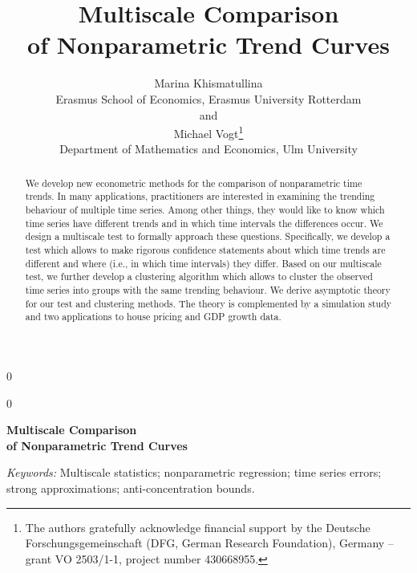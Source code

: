 \documentclass[12pt]{article}
\newcommand{\blind}{0}
\begin{document}
\def\spacingset#1{\renewcommand{\baselinestretch}%
{#1}\small\normalsize} \spacingset{1}

\blind
{
  \title{\bf Multiscale Comparison \\[0.1cm] of Nonparametric Trend Curves}
  \author{Marina Khismatullina\\ Erasmus School of Economics, Erasmus University Rotterdam\\
  and \\
  Michael Vogt\thanks{
  The authors gratefully acknowledge financial support by the Deutsche Forschungsgemeinschaft 
  (DFG, German Research Foundation), Germany – grant VO 2503/1-1, project number 430668955.}
  \hspace{.2cm}\\
  Department of Mathematics and Economics, Ulm University}
  \maketitle
} \fi

\blind
{
  \bigskip
  \bigskip
  \bigskip
  \begin{center}
    {\LARGE\bf Multiscale Comparison \\[0.3cm] of Nonparametric Trend Curves}
\end{center}
  \medskip
} \fi

\bigskip
\begin{abstract}
{\noindent We develop new econometric methods for the comparison of nonparametric time trends. In many applications, practitioners are interested in examining the trending behaviour of multiple time series. Among other things, they would like to know which time series have different trends and in which time intervals the differences occur. We design a multiscale test to formally approach these questions. Specifically, we develop a test which allows to make rigorous confidence statements about which time trends are different and where (i.e., in which time intervals) they differ. Based on our multiscale test, we further develop a clustering algorithm which allows to cluster the observed time series into groups with the same trending behaviour. We derive asymptotic theory for our test and clustering methods. The theory is complemented by a simulation study and two applications to house pricing and GDP growth data.}
\end{abstract}

\noindent%
{\it Keywords:} Multiscale statistics; nonparametric regression; time series errors; strong approximations; anti-concentration bounds.
\vfill
\end{document}
